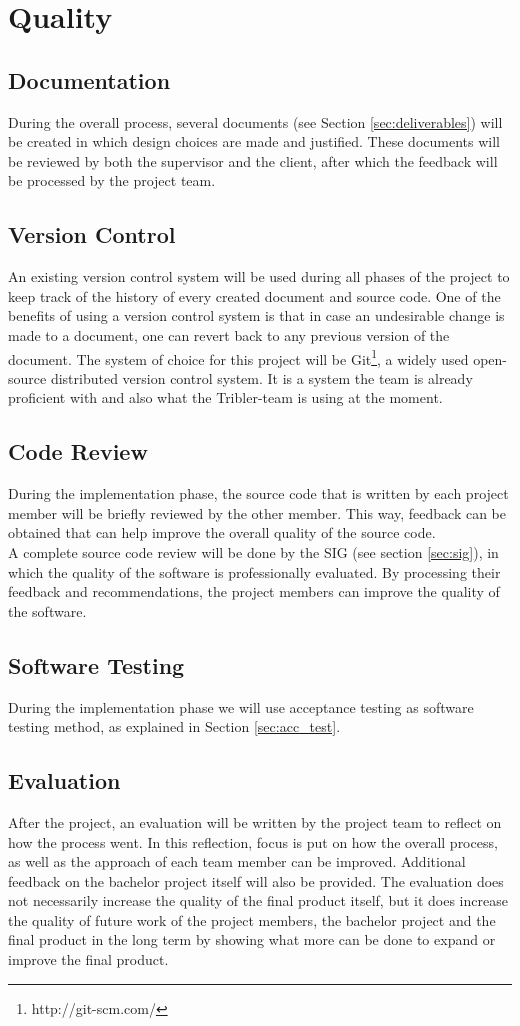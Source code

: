 \section{Quality}
\subsection{Documentation}
During the overall process, several documents (see Section \ref{sec:deliverables}) will be created in which design choices are made and justified. These documents will be reviewed by both the supervisor and the client, after which the feedback will be processed by the project team. 
\subsection{Version Control}
An existing version control system will be used during all phases of the project to keep track of the history of every created document and source code. One of the benefits of using a version control system is that in case an undesirable change is made to a document, one can revert back to any previous version of the document. The system of choice for this project will be Git\footnote{http://git-scm.com/}, a widely used open-source distributed version control system. It is a system the team is already proficient with and also what the Tribler-team is using at the moment.
\subsection{Code Review}
During the implementation phase, the source code that is written by each project member will be briefly reviewed by the other member. This way, feedback can be obtained that can help improve the overall quality of the source code.\\
A complete source code review will be done by the SIG (see section \ref{sec:sig}), in which the quality of the software is professionally evaluated. By processing their feedback and recommendations, the project members can improve the quality of the software.
\subsection{Software Testing}
During the implementation phase we will use acceptance testing as software testing method, as explained in Section \ref{sec:acc_test}.
\subsection{Evaluation}
After the project, an evaluation will be written by the project team to reflect on how the process went. In this reflection, focus is put on how the overall process, as well as the approach of each team member can be improved. Additional feedback on the bachelor project itself will also be provided. The evaluation does not necessarily increase the quality of the final product itself, but it does increase the quality of future work of the project members, the bachelor project and the final product in the long term by showing what more can be done to expand or improve the final product.


